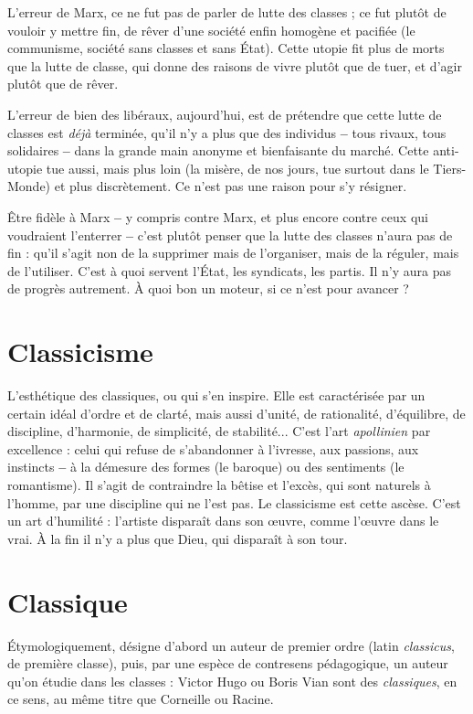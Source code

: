 L'erreur de Marx, ce ne fut pas de parler de lutte des classes ; ce fut plutôt
de vouloir y mettre fin, de rêver d’une société enfin homogène et pacifiée (le
communisme, société sans classes et sans État). Cette utopie fit plus de morts
que la lutte de classe, qui donne des raisons de vivre plutôt que de tuer, et d’agir
plutôt que de rêver.

L'erreur de bien des libéraux, aujourd’hui, est de prétendre que cette lutte
de classes est {\it déjà} terminée, qu’il n’y a plus que des individus {\bf --} tous rivaux,
tous solidaires {\bf --} dans la grande main anonyme et bienfaisante du marché.
Cette anti-utopie tue aussi, mais plus loin (la misère, de nos jours, tue surtout
dans le Tiers-Monde) et plus discrètement. Ce n’est pas une raison pour s’y
résigner.

Être fidèle à Marx {\bf --} y compris contre Marx, et plus encore contre ceux qui
voudraient l’enterrer {\bf --} c’est plutôt penser que la lutte des classes n’aura pas de
fin : qu’il s’agit non de la supprimer mais de l’organiser, mais de la réguler,
mais de l'utiliser. C’est à quoi servent l’État, les syndicats, les partis. Il n’y aura
pas de progrès autrement. À quoi bon un moteur, si ce n’est pour avancer ?

\section{Classicisme}
L’esthétique des classiques, ou qui s’en inspire. Elle est
caractérisée par un certain idéal d’ordre et de clarté, mais
aussi d'unité, de rationalité, d'équilibre, de discipline, d'harmonie, de simplicité,
de stabilité... C’est l’art {\it apollinien} par excellence : celui qui refuse de
s’abandonner à l'ivresse, aux passions, aux instincts {\bf --} à la démesure des formes
(le baroque) ou des sentiments (le romantisme). Il s’agit de contraindre la
bêtise et l’excès, qui sont naturels à l’homme, par une discipline qui ne l’est pas.
Le classicisme est cette ascèse. C’est un art d’humilité : l’artiste disparaît dans
son œuvre, comme l’œuvre dans le vrai. À la fin il n’y a plus que Dieu, qui disparaît
à son tour.

\section{Classique}
Étymologiquement, désigne d’abord un auteur de premier ordre
(latin {\it classicus}, de première classe), puis, par une espèce de
contresens pédagogique, un auteur qu’on étudie dans les classes : Victor Hugo
ou Boris Vian sont des {\it classiques}, en ce sens, au même titre que Corneille ou
Racine.

